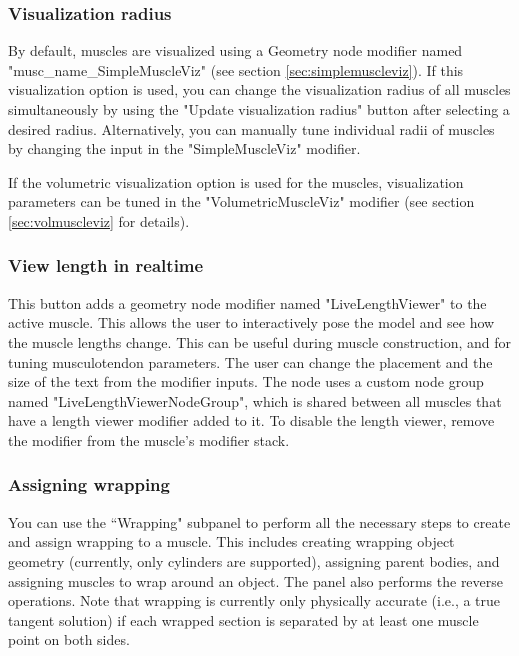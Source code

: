 \documentclass{article}
\begin{document}
\subsubsection{Visualization radius}
By default, muscles are visualized using a Geometry node modifier named "musc\_name\_SimpleMuscleViz" (see section \ref{sec:simplemuscleviz}). If this visualization option is used, you can change the visualization radius of all muscles simultaneously by using the "Update visualization radius" button after selecting a desired radius. Alternatively, you can manually tune individual radii of muscles by changing the input in the "SimpleMuscleViz" modifier.

If the volumetric visualization option is used for the muscles, visualization parameters can be tuned in the "VolumetricMuscleViz" modifier (see section \ref{sec:volmuscleviz} for details).

\subsubsection{View length in realtime}

This button adds a geometry node modifier named "LiveLengthViewer" to the active muscle. This allows the user to interactively pose the model and see how the muscle lengths change. This can be useful during muscle construction, and for tuning musculotendon parameters. The user can change the placement and the size of the text from the modifier inputs. %
The node uses a custom node group named "LiveLengthViewerNodeGroup", which is shared between all muscles that have a length viewer modifier added to it. To disable the length viewer, remove the modifier from the muscle's modifier stack.


\subsubsection{Assigning wrapping}

You can use the ``Wrapping" subpanel to perform all the necessary steps to create and assign wrapping to a muscle. This includes creating wrapping object geometry (currently, only cylinders are supported), assigning parent bodies, and assigning muscles to wrap around an object. The panel also performs the reverse operations. Note that wrapping is currently only physically accurate (i.e., a true tangent solution) if each wrapped section is separated by at least one muscle point on both sides.
\end{document}

